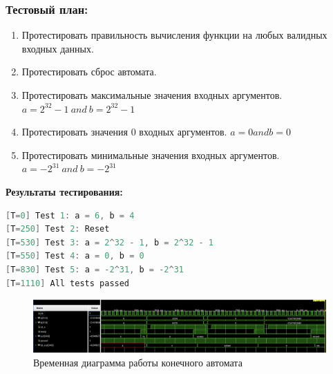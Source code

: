 \documentclass[12pt,onecolumn]{article}
\begin{document}
\subsubsection{Тестовый план:}
\begin{enumerate}
  \item Протестировать правильность вычисления функции на любых валидных входных данных.
  \item Протестировать сброс автомата.
  \item Протестировать максимальные значения входных аргументов. $a = 2^{32} - 1~ and~ b = 2^{32} - 1$
  \item Протестировать значения 0 входных аргументов. $a = 0 and b = 0$
  \item Протестировать минимальные значения входных аргументов. $a = -2^{31}~ and~ b = -2^{31}$
\end{enumerate}

\textbf{Результаты тестирования:}
\begin{lstlisting}[language=verilog]
[T=0] Test 1: a = 6, b = 4
[T=250] Test 2: Reset
[T=530] Test 3: a = 2^32 - 1, b = 2^32 - 1
[T=550] Test 4: a = 0, b = 0
[T=830] Test 5: a = -2^31, b = -2^31
[T=1110] All tests passed
\end{lstlisting}


\begin{figure}[H]
  \centering
  \includegraphics[width=\textwidth]{image/fsm-diagram.png}
  \caption{Временная диаграмма работы конечного автомата}
\end{figure}
\end{document}
